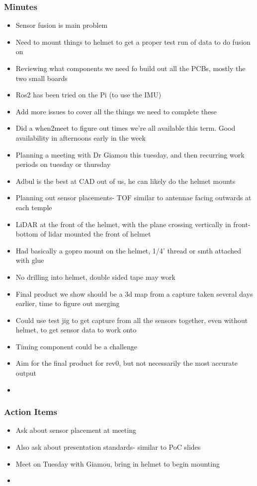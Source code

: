 		\subsubsection*{Minutes}
			\begin{itemize}
				\item Sensor fusion is main problem
				\item Need to mount things to helmet to get a proper test run of data to do fusion on
				\item Reviewing what components we need fo build out all the PCBs, mostly the two small boards
				\item Ros2 has been tried on the Pi (to use the IMU)
				\item Add more issues to cover all the things we need to complete these
				\item Did a when2meet to figure out times we're all available this term. Good availability in afternoons early in the week
				\item Planning a meeting with Dr Giamou this tuesday, and then recurring work periods on tuesday or thursday
				\item Adbul is the best at CAD out of us, he can likely do the helmet mounts
				\item Planning out sensor placements- TOF similar to antennae facing outwards at each temple
				\item LiDAR at the front of the helmet, with the plane crossing vertically in front- bottom of lidar mounted the front of helmet
				\item Had basically a gopro mount on the helmet, 1/4' thread or smth attached with glue
				\item No drilling into helmet, double sided tape may work
				\item Final product we show should be a 3d map from a capture taken several days earlier, time to figure out merging
				\item Could use test jig to get capture from all the sensors together, even without helmet, to get sensor data to work onto
				\item Timing component could be a challenge
				\item Aim for the final product for rev0, but not necessarily the most accurate output
				\item 
			\end{itemize}

		\subsubsection*{Action Items}
			\begin{itemize}
				\item Ask about sensor placement at meeting
				\item Also ask about presentation standards- similar to PoC slides
				\item Meet on Tuesday with Giamou, bring in helmet to begin mounting
				\item 
			\end{itemize}


